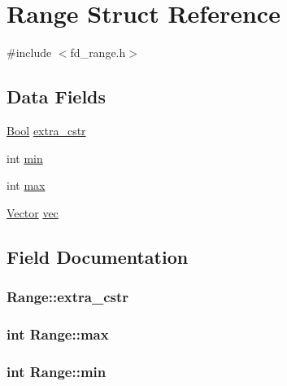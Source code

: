 \hypertarget{structRange}{}\section{Range Struct Reference}
\label{structRange}


{\ttfamily \#include $<$fd\+\_\+range.\+h$>$}

\subsection*{Data Fields}
\begin{DoxyCompactItemize}
\item 
\hyperlink{bool_8h_afdcfe6db5bea87bd493a3fe2c513d5ef}{Bool} \hyperlink{structRange_a875104bdfb7f25377692ee3511b6cda7}{extra\+\_\+cstr}
\item 
int \hyperlink{structRange_ac3ccecdd1d8e143102bb4c2b5c0837d7}{min}
\item 
int \hyperlink{structRange_a7f490d5301f027e9defc4abf3970bf00}{max}
\item 
\hyperlink{fd__range_8h_a3cb8772380a4656f7d8c5d5c6346985e}{Vector} \hyperlink{structRange_aa1fc33857cb97860b7c55a8f90ad6e3f}{vec}
\end{DoxyCompactItemize}


\subsection{Field Documentation}
\subsubsection[{\texorpdfstring{extra\+\_\+cstr}{extra_cstr}}]{ Range\+::extra\+\_\+cstr}\hypertarget{structRange_a875104bdfb7f25377692ee3511b6cda7}{}\label{structRange_a875104bdfb7f25377692ee3511b6cda7}
\subsubsection[{\texorpdfstring{max}{max}}]{\setlength{\rightskip}{0pt plus 5cm}int Range\+::max}\hypertarget{structRange_a7f490d5301f027e9defc4abf3970bf00}{}\label{structRange_a7f490d5301f027e9defc4abf3970bf00}
\subsubsection[{\texorpdfstring{min}{min}}]{\setlength{\rightskip}{0pt plus 5cm}int Range\+::min}\hypertarget{structRange_ac3ccecdd1d8e143102bb4c2b5c0837d7}{}\label{structRange_ac3ccecdd1d8e143102bb4c2b5c0837d7}
